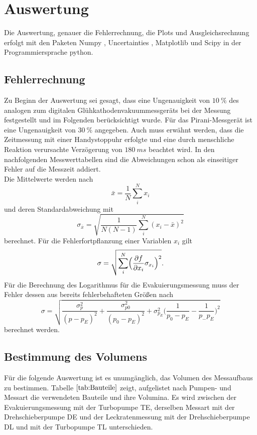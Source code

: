 \section{Auswertung}
Die Auswertung, genauer die Fehlerrechnung, die Plots und Ausgleichsrechnung erfolgt mit den Paketen
Numpy \cite{numpy}, Uncertainties \cite{uncertainties}, Matplotlib \cite{matplotlib} und Scipy \cite{scipy} in der Programmiersprache python.
\subsection{Fehlerrechnung}
Zu Beginn der Auswertung sei gesagt, dass eine Ungenauigkeit von $\SI{10}{\percent}$ des analogen zum digitalen Glühkathodenvakuummessgeräts
bei der Messung festgestellt und im Folgenden berücksichtigt wurde.
Für das Pirani-Messgerät ist eine Ungenauigkeit von $\SI{30}{\percent}$ angegeben\cite{anleitung}.
Auch muss erwähnt werden, dass die Zeitmessung mit einer Handystoppuhr erfolgte und eine durch menschliche Reaktion verursachte
Verzögerung von $\SI{180}{ms}$ beachtet wird\cite{reaktion}.
In den nachfolgenden Messwerttabellen sind die Abweichungen schon als einseitiger Fehler auf die Messzeit addiert.\\
Die Mittelwerte werden nach
\begin{equation}
	\bar{x}=\frac{1}{N}\sum_{i}^N x_i
\end{equation}
und deren Standardabweichung mit
\begin{equation}
	\sigma_{\bar{x}} = \sqrt{\frac{1}{N(N-1)} \sum_{i}^N (x_i-\bar{x})^2}
\end{equation}
berechnet.
Für die Fehlerfortpflanzung einer Variablen $x_i$ gilt
\begin{equation}
	\sigma = \sqrt{\sum_{i}^N \Bigl(\frac{\partial f}{\partial x_i} \sigma_{x_i}\Bigr)^2}.
	\label{eq:gaussfehler}
\end{equation}
Für die Berechnung des Logarithmus für die Evakuierungsmessung muss der Fehler dessen aus bereits fehlerbehafteten Größen nach
\begin{equation}
	\sigma = \sqrt{\frac{\sigma_p^2}{(p-p_E)^2}+\frac{\sigma_{p0}^2}{(p_0-p_E)^2}+\sigma_{p_E}^2\bigl(\frac{1}{p_0-p_E}-\frac{1}{p_-p_E}\bigr)^2}
\end{equation}
berechnet werden.
\subsection{Bestimmung des Volumens}
Für die folgende Auswertung ist es unumgänglich, das Volumen des Messaufbaus zu bestimmen.
Tabelle $\ref{tab:Bauteile}$ zeigt, aufgelistet nach Pumpen- und Messart die verwendeten Bauteile und ihre Volumina.
Es wird zwischen der Evakuierungsmessung mit der Turbopumpe TE, derselben Messart mit der Drehschieberpumpe DE und der Leckratenmessung
mit der Drehschieberpumpe DL und mit der Turbopumpe TL unterschieden.\newline

